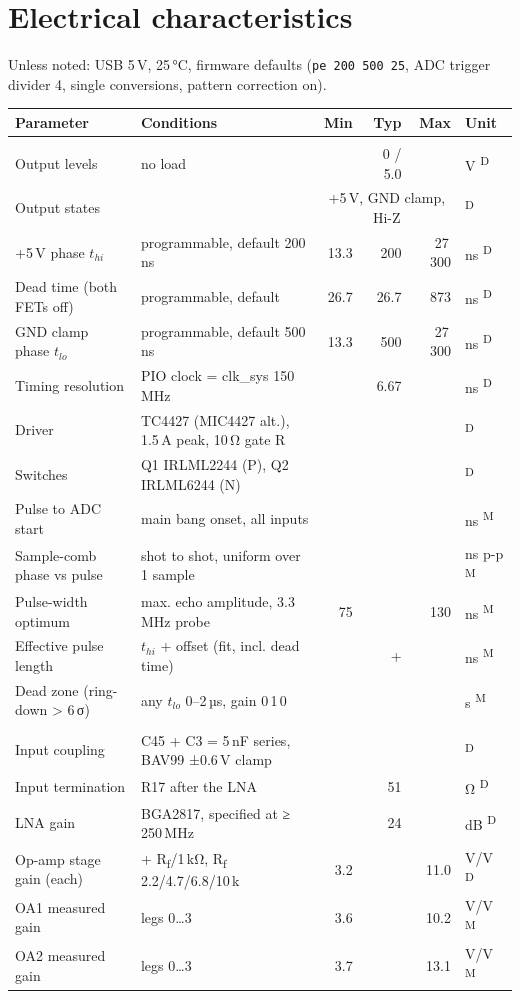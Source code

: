 \documentclass[10pt,a4paper]{article}
\makeatletter
\newcommand{\cmd}[1]{\texttt{#1}}
\newcommand{\meas}{\textsuperscript{M}}
\newcommand{\des}{\textsuperscript{D}}
\newenvironment{spec}[1]{%
  \small\begin{longtable}{@{}>{\raggedright\arraybackslash}p{50mm}>{\raggedright\arraybackslash}p{55mm}rrrl@{}}
  \toprule\textbf{Parameter} & \textbf{Conditions} & \textbf{Min} & \textbf{Typ} & \textbf{Max} & \textbf{Unit}\\\midrule\endhead
  \multicolumn{6}{@{}l}{\color{accent}\bfseries #1}\\}{\bottomrule\end{longtable}}
\newcommand{\grp}[1]{\multicolumn{6}{@{}l}{\color{accent}\bfseries #1}\\}
\makeatother
\begin{document}
\section{Electrical characteristics}
Unless noted: USB 5\,V, 25\,°C, firmware defaults (\cmd{pe 200 500 25}, ADC trigger divider 4, single conversions, pattern correction on).
\begin{spec}{Transmit (pulser)}
Output levels & no load & & 0 / 5.0 & & V \des\\
Output states & & \multicolumn{3}{c}{+5\,V, GND clamp, Hi-Z} & \des\\
+5\,V phase $t_{hi}$ & programmable, default 200\,ns & 13.3 & 200 & 27\,300 & ns \des\\
Dead time (both FETs off) & programmable, default & 26.7 & 26.7 & 873 & ns \des\\
GND clamp phase $t_{lo}$ & programmable, default 500\,ns & 13.3 & 500 & 27\,300 & ns \des\\
Timing resolution & PIO clock = clk\_sys 150\,MHz & & 6.67 & & ns \des\\
Driver & TC4427 (MIC4427 alt.), 1.5\,A peak, 10\,Ω gate R & & & & \des\\
Switches & Q1 IRLML2244 (P), Q2 IRLML6244 (N) & & & & \des\\
Pulse to ADC start & main bang onset, all inputs & & \vonsetns & & ns \meas\\
Sample-comb phase vs pulse & shot to shot, uniform over 1 sample & & \vjitspan & & ns p-p \meas\\
Pulse-width optimum & max. echo amplitude, 3.3\,MHz probe & 75 & \vhibest & 130 & ns \meas\\
Effective pulse length & $t_{hi}$ + offset (fit, incl. dead time) & & +\vdeltaeff & & ns \meas\\
Dead zone (ring-down > 6\,σ) & any $t_{lo}$ 0–2\,µs, gain 0\,1\,0 & & \vdeadzone & & \textmu s \meas\\
\grp{Receive chain}
Input coupling & C45 + C3 = 5\,nF series, BAV99 ±0.6\,V clamp & & & & \des\\
Input termination & R17 after the LNA & & 51 & & Ω \des\\
LNA gain & BGA2817, specified at ≥ 250\,MHz & & 24 & & dB \des\\
Op-amp stage gain (each) & 1 + R\textsubscript{f}/1\,kΩ, R\textsubscript{f} 2.2/4.7/6.8/10\,k & 3.2 & & 11.0 & V/V \des\\
OA1 measured gain & legs 0…3 & 3.6 & & 10.2 & V/V \meas\\
OA2 measured gain & legs 0…3 & 3.7 & & 13.1 & V/V \meas\\

\end{spec}
\end{document}
